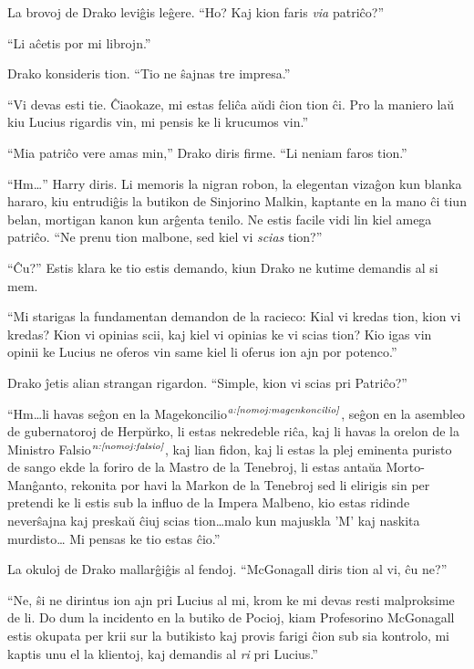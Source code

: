 La brovoj de Drako leviĝis leĝere. ``Ho? Kaj kion faris \emph{via} patriĉo?''

``Li aĉetis por mi librojn.''

Drako konsideris tion. ``Tio ne ŝajnas tre impresa.''

``Vi devas esti tie. Ĉiaokaze, mi estas feliĉa aŭdi ĉion tion ĉi. Pro la
maniero laŭ kiu Lucius rigardis vin, mi pensis ke li krucumos
vin.''

``Mia patriĉo vere amas min,'' Drako diris firme. ``Li neniam faros tion.''

``Hm\ldots'' Harry diris. Li memoris la nigran robon, la elegentan
vizaĝon kun blanka hararo, kiu entrudiĝis la butikon de Sinjorino
Malkin, kaptante en la mano ĉi tiun belan, mortigan kanon kun arĝenta
tenilo. Ne estis facile vidi lin kiel amega patriĉo. ``Ne prenu
tion malbone, sed kiel vi \emph{scias} tion?''

``Ĉu?'' Estis klara ke tio estis demando, kiun Drako ne kutime
demandis al si mem.

``Mi starigas la fundamentan demandon de la racieco: Kial vi kredas
tion, kion vi kredas? Kion vi opinias scii, kaj kiel vi opinias ke vi
scias tion? Kio igas vin opinii ke Lucius ne oferos vin same kiel li
oferus ion ajn por potenco.''

Drako ĵetis alian strangan rigardon. ``Simple, kion vi scias pri
Patriĉo?''

``Hm\ldots li havas seĝon en la Magekoncilio$^{\textit{a:\ref{nomoj:magenkoncilio}}}$,
seĝon en la asembleo de gubernatoroj de Herpŭrko, li estas nekredeble
riĉa, kaj li havas la orelon de la Ministro
Falsio$^{\textit{n:\ref{nomoj:falsio}}}$, kaj lian fidon, kaj li estas la plej
eminenta puristo de sango ekde la foriro de la Mastro de la
Tenebroj, li estas antaŭa Morto-Manĝanto, rekonita por havi la Markon
de la Tenebroj sed li elirigis sin per pretendi ke li estis sub la
influo de la Impera Malbeno, kio estas ridinde neverŝajna kaj preskaŭ
ĉiuj scias tion\ldots malo kun majuskla 'M' kaj naskita murdisto\ldots
Mi pensas ke tio estas ĉio.''

La okuloj de Drako mallarĝiĝis al fendoj. ``McGonagall diris tion al vi,
ĉu ne?''

``Ne, ŝi ne dirintus ion ajn pri Lucius al mi, krom ke mi devas resti
malproksime de li. Do dum la incidento en la butiko de Pocioj, kiam
Profesorino McGonagall estis okupata per krii sur la butikisto kaj
provis farigi ĉion sub sia kontrolo, mi kaptis unu el la klientoj, kaj
demandis al \emph{ri} pri Lucius.''

